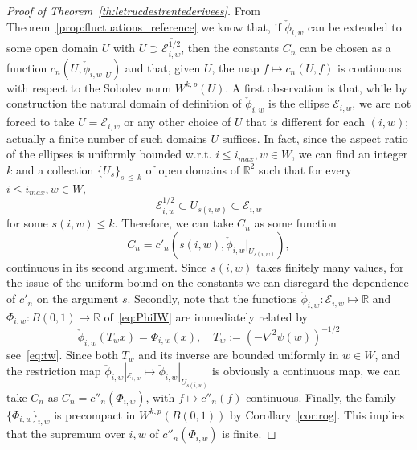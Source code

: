\documentclass[10pt]{amsart}
\theoremstyle{definition}\newtheorem{defi}[theo]{Definition}\newtheorem{rema}[theo]{Remark}\newtheorem{exam}[theo]{Example}\newtheorem{exem}[theo]{Example}\newtheorem{nota}[theo]{Notation}
\newcommand{\R}{\mathbb{R}}
\newcommand{\clE}{\mathcal{E}}
\begin{document}
\begin{proof}[Proof of Theorem~\ref{th:letrucdestrentederivees}]
From Theorem~\ref{prop:fluctuations_reference} we know that, if $\check\phi_{i,w}$ can be extended to some open domain $U$ with $U\supset \overline{\clE^{1/2}_{i,w}}$, then the constants $C_n$ can be chosen as a function $c_n(U,\check \phi_{i,w}|_U)$ and that, given $U$, the map $f\mapsto c_n(U,f)$ is continuous with respect to the Sobolev norm $W^{k,p}(U)$. A first observation is that, while by construction the natural domain of definition of $\check \phi_{i,w}$ is the ellipse $\clE_{i,w}$, we are not forced to take $U= \clE_{i,w}$ or any other choice of $U$ that is different for each $(i,w)$; actually a finite number of such domains $U$ suffices. In fact, since the aspect ratio of the ellipses is uniformly bounded w.r.t. $i\le i_{max},w\in W$, we can find an integer $k$ and a collection $\{U_s\}_{s\,\le\,k}$ of open domains of $\R^2$ such that for every $i\le i_{max},w\in W$,
\begin{equation}
\clE^{1/2}_{i,w}\subset U_{s(i,w)} \subset \clE_{i,w}
\end{equation}
for some $s(i,w)\le k$. Therefore, we can take $C_n$ as some function
\begin{equation}
C_n=c'_n\left(s(i,w),\check\phi_{i,w}|_{U_{s(i,w)}}\right),
\end{equation}
continuous in its second argument. Since $s(i,w)$ takes finitely many values, for the issue of the uniform bound on the constants we can disregard the dependence of $c'_n$ on the argument $s$. Secondly, note that the functions $\check\phi_{i,w}:\clE_{i,w}\mapsto \R$ and $\Phi_{i,w}:B(0,1)\mapsto \R$ of~\eqref{eq:PhiIW} are immediately related by
\begin{equation}
\check \phi_{i,w}(T_w x) = \Phi_{i,w}(x), \quad T_w:=\left(-\nabla^2\psi(w)\right)^{-1/2}
\end{equation}
see~\eqref{eq:tw}. Since both $T_w$ and its inverse are bounded uniformly in $w\in W$, and the restriction map $\check\phi_{i,w}|_{\clE_{i,w}}\mapsto
\check\phi_{i,w}|_{U_{s(i,w)}}$ is obviously a continuous map, we can take $C_n$ as $C_n=c''_n(\Phi_{i,w})$, with $f\mapsto c''_n(f)$ continuous. Finally, the family $\{\Phi_{i,w}\}_{i,w}$ is precompact in $W^{k,p}(B(0,1))$ by Corollary~\ref{cor:rog}. This implies that the supremum over $i,w$ of $c''_n(\Phi_{i,w})$ is finite.
\end{proof}
\end{document}
